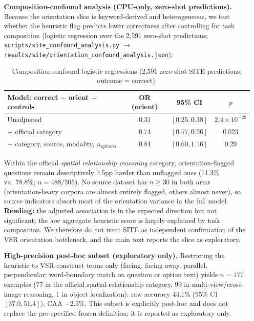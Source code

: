 \textbf{Composition-confound analysis (CPU-only, zero-shot predictions).}
Because the orientation slice is keyword-derived and heterogeneous, we test
whether the heuristic flag predicts lower correctness after controlling for
task composition (logistic regression over the 2,591 zero-shot predictions;
\texttt{scripts/site\_confound\_analysis.py} $\rightarrow$
\texttt{results/site/orientation\_confound\_analysis.json}):

\begin{table}[h]
\centering
\footnotesize
\caption{Composition-confound logistic regressions (2,591 zero-shot SITE
predictions; outcome = correct).}
\label{tab:confound}
\begin{tabular}{lccc}
\toprule
Model: correct $\sim$ orient $+$ controls & OR (orient) & 95\% CI & $p$ \\
\midrule
Unadjusted & 0.31 & $[0.25, 0.38]$ & $2.4\times10^{-28}$ \\
$+$ official category & 0.74 & $[0.57, 0.96]$ & 0.023 \\
$+$ category, source, modality, $n_{options}$ & 0.84 & $[0.60, 1.16]$ & 0.29 \\
\bottomrule
\end{tabular}
\end{table}

Within the official \emph{spatial relationship reasoning} category,
orientation-flagged questions remain descriptively 7.5pp harder than unflagged
ones (71.3\% vs.\ 78.8\%; $n{=}488/505$). No source dataset has $n{\ge}30$ in
both arms (orientation-heavy corpora are almost entirely flagged, others almost
never), so source indicators absorb most of the orientation variance in the
full model. \textbf{Reading:} the adjusted association is in the expected
direction but not significant; the low aggregate heuristic score is largely
explained by task composition. We therefore do not treat SITE as independent
confirmation of the VSR orientation bottleneck, and the main text reports the
slice as exploratory.

\textbf{High-precision post-hoc subset (exploratory only).} Restricting the
heuristic to VSR-construct terms only (facing, facing away, parallel,
perpendicular; word-boundary match on question or option text) yields
$n{=}177$ examples (77 in the official spatial-relationship category, 99 in
multi-view/cross-image reasoning, 1 in object localization): raw accuracy 44.1\% (95\% CI $[37.0, 51.4]$),
CAA $-2.3\%$. This subset is explicitly post-hoc and does not replace the
pre-specified frozen definition; it is reported as exploratory only.

